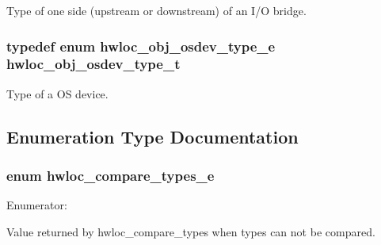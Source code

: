 Type of one side (upstream or downstream) of an I/O bridge. 

\hypertarget{a00041_ga90c1e82a60ba5871d07645169e636987}{
\subsubsection[{hwloc\_\-obj\_\-osdev\_\-type\_\-t}]{\setlength{\rightskip}{0pt plus 5cm}typedef enum {\bf hwloc\_\-obj\_\-osdev\_\-type\_\-e}  {\bf hwloc\_\-obj\_\-osdev\_\-type\_\-t}}}
\label{a00041_ga90c1e82a60ba5871d07645169e636987}


Type of a OS device. 



\subsection{Enumeration Type Documentation}
\hypertarget{a00041_ga46323568968005137c32f6a1cd405b74}{
\subsubsection[{hwloc\_\-compare\_\-types\_\-e}]{\setlength{\rightskip}{0pt plus 5cm}enum {\bf hwloc\_\-compare\_\-types\_\-e}}}
\label{a00041_ga46323568968005137c32f6a1cd405b74}
\begin{Desc}
\item[Enumerator: ]\par
\begin{description}
\item[{\em 
\hypertarget{a00041_gga46323568968005137c32f6a1cd405b74a2f8297ea36eba46e7596e810a67298fb}{
HWLOC\_\-TYPE\_\-UNORDERED}
\label{a00041_gga46323568968005137c32f6a1cd405b74a2f8297ea36eba46e7596e810a67298fb}
}]Value returned by hwloc\_\-compare\_\-types when types can not be compared. \end{description}
\end{Desc}

